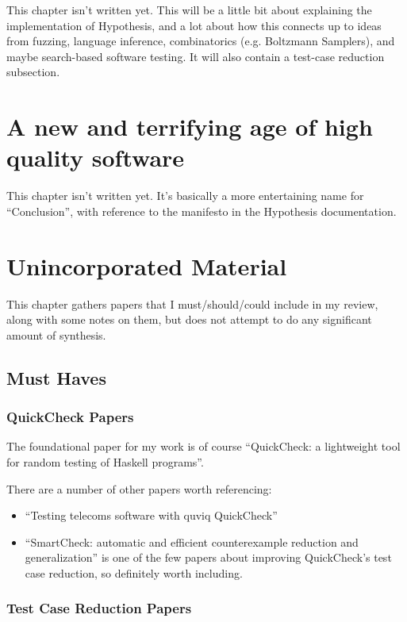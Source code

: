This chapter isn't written yet.
This will be a little bit about explaining the implementation of Hypothesis,
and a lot about how this connects up to ideas from fuzzing, language inference, combinatorics (e.g. Boltzmann Samplers), and maybe search-based software testing.
It will also contain a test-case reduction subsection.

\chapter{A new and terrifying age of high quality software}\label{chap:conclusion}

This chapter isn't written yet.
It's basically a more entertaining name for ``Conclusion'',
with reference to the manifesto in the Hypothesis documentation.

\chapter{Unincorporated Material}

This chapter gathers papers that I must/should/could include in my review,
along with some notes on them,
but does not attempt to do any significant amount of synthesis.

\section{Must Haves}

\subsection{QuickCheck Papers}

The foundational paper for my work is of course ``QuickCheck: a lightweight tool for random testing of Haskell programs''\cite{DBLP:conf/icfp/ClaessenH00}.

There are a number of other papers worth referencing:

\begin{itemize}
\item ``Testing telecoms software with quviq QuickCheck''\cite{DBLP:conf/erlang/ArtsHJW06}
\item ``SmartCheck: automatic and efficient counterexample reduction and generalization''\cite{DBLP:conf/haskell/Pike14} is one of the few papers about improving QuickCheck's test case reduction,
so definitely worth including.
\end{itemize}

\subsection{Test Case Reduction Papers}

